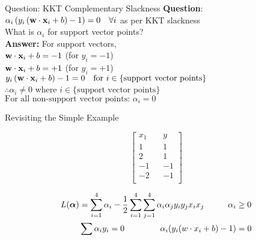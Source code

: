 \documentclass{beamer}
\begin{document}
\begin{frame}{Question: KKT Complementary Slackness}
\textbf{Question}:\\
\vspace{2mm}
$\alpha_{i}\left(y_{i}\left(\mathbf{w} \cdot \mathbf{x}_{i}+b\right)-1\right)=0 \quad \forall i$ as per KKT slackness\\
\vspace{2mm}
What is $\alpha_{i}$ for support vector points?\\
\vspace{4mm}
\textbf{Answer:}
For support vectors,\\
\hspace{1in}$\mathbf{w} \cdot \mathbf{x}_{i} + b  = -1$ (for $y_i = -1$)\\
\hspace{1in}$\mathbf{w} \cdot \mathbf{x}_{i} + b  = +1$ (for $y_i = +1$)\\
\vspace{2mm}
$y_{i}\left(\mathbf{w} \cdot \mathbf{x}_{i}+b\right)-1=0 \quad \text {for } i \in \{\text{support vector points}\}$\\
$\therefore \alpha_{i} \neq 0$ where $i \in \{\text{support vector points}\}$
\vspace{5mm}
$\text{For all non-support vector points: }\alpha_{i} = 0$
\end{frame}

{
	
}


\begin{frame}{Revisiting the Simple Example}


\begin{equation*}
\begin{bmatrix}
x_{1} && y \\
1 && 1\\
2 && 1\\
-1 && -1\\
-2 && -1\\
\end{bmatrix}
\end{equation*}

\begin{align*}
L(\boldsymbol{\alpha}) &= \sum_{i=1}^{4} \alpha_{i} - \frac{1}{2}\sum_{i=1}^{4}\sum_{j=1}^{4}\alpha_{i}\alpha_{j}y_{i}y_{j}x_i x_j \hspace{1cm}\alpha_{i} \geq 0 \\
&\sum \alpha_{i}y_{i} = 0 \hspace{1.5cm}
\alpha_{i}(y_{i}(w \cdot x_i + b) - 1) = 0
\end{align*}

\end{frame}
\end{document}
